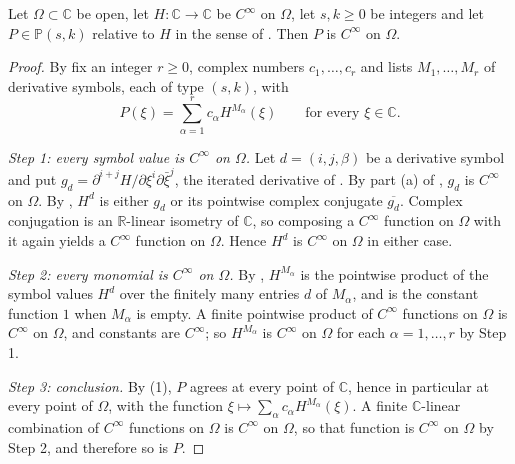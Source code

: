 \begin{lemma}
Let $\Omega\subset\mathbb{C}$ be open, let $H\colon\mathbb{C}\to\mathbb{C}$ be
$C^\infty$ on $\Omega$, let $s,k\ge0$ be integers and let
$P\in\mathbb{P}(s,k)$ relative to $H$ in the sense of .  Then
$P$ is $C^\infty$ on $\Omega$.
\end{lemma}
\begin{proof}
By  fix an integer $r\ge0$, complex numbers $c_1,\dots,c_r$ and
lists $M_1,\dots,M_r$ of derivative symbols, each of type $(s,k)$, with
\begin{equation}\tag{1}
  P(\xi)=\sum_{\alpha=1}^{r}c_\alpha H^{M_\alpha}(\xi)\qquad\text{for every }\xi\in\mathbb{C}.
\end{equation}

\emph{Step 1: every symbol value is $C^\infty$ on $\Omega$.}  Let
$d=(i,j,\beta)$ be a derivative symbol and put
$g_d=\partial^{i+j}H/\partial\xi^i\partial\bar\xi^j$, the iterated derivative
of .  By part (a) of ,
$g_d$ is $C^\infty$ on $\Omega$.  By , $H^{d}$ is either
$g_d$ or its pointwise complex conjugate $\overline{g_d}$.  Complex
conjugation is an $\mathbb{R}$-linear isometry of $\mathbb{C}$, so composing a
$C^\infty$ function on $\Omega$ with it again yields a $C^\infty$ function on
$\Omega$.  Hence $H^{d}$ is $C^\infty$ on $\Omega$ in either case.

\emph{Step 2: every monomial is $C^\infty$ on $\Omega$.}  By
, $H^{M_\alpha}$ is the pointwise product of the symbol
values $H^{d}$ over the finitely many entries $d$ of $M_\alpha$, and is the
constant function $1$ when $M_\alpha$ is empty.  A finite pointwise product of
$C^\infty$ functions on $\Omega$ is $C^\infty$ on $\Omega$, and constants are
$C^\infty$; so $H^{M_\alpha}$ is $C^\infty$ on $\Omega$ for each
$\alpha=1,\dots,r$ by Step 1.

\emph{Step 3: conclusion.}  By (1), $P$ agrees at every point of $\mathbb{C}$,
hence in particular at every point of $\Omega$, with the function
$\xi\mapsto\sum_{\alpha}c_\alpha H^{M_\alpha}(\xi)$.  A finite
$\mathbb{C}$-linear combination of $C^\infty$ functions on $\Omega$ is
$C^\infty$ on $\Omega$, so that function is $C^\infty$ on $\Omega$ by Step 2,
and therefore so is $P$.
\end{proof}
